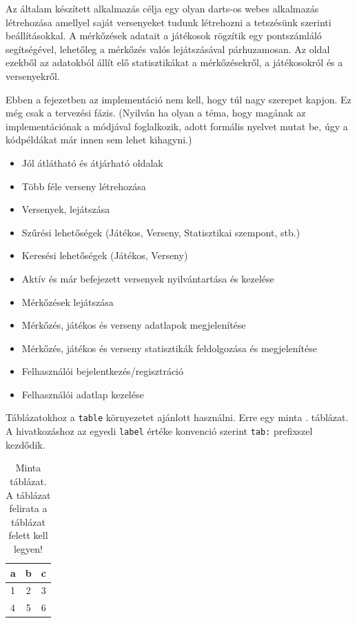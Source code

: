 
Az általam készített alkalmazás célja egy olyan darts-os webes alkalmazás létrehozása amellyel saját versenyeket tudunk létrehozni a tetszésünk szerinti beállításokkal. A mérkőzések adatait a játékosok rögzítik egy pontszámláló segítségével, lehetőleg a mérkőzés valós lejátszásával párhuzamosan. Az oldal ezekből az adatokból állít elő statisztikákat a mérkőzésekről, a játékosokról és a versenyekről.


Ebben a fejezetben az implementáció nem kell, hogy túl nagy szerepet kapjon.
Ez még csak a tervezési fázis.
(Nyilván ha olyan a téma, hogy magának az implementációnak a módjával foglalkozik, adott formális nyelvet mutat be, úgy a kódpéldákat már innen sem lehet kihagyni.)

\begin{itemize}
\item Jól átlátható és átjárható oldalak
\item Több féle verseny létrehozása
\item Versenyek, lejátszása
\item Szűrési lehetőségek (Játékos, Verseny, Statisztikai szempont, stb.)
\item Keresési lehetőségek (Játékos, Verseny)
\item Aktív és már befejezett versenyek nyilvántartása és kezelése
\item Mérkőzések lejátszása
\item Mérkőzés, játékos és verseny adatlapok megjelenítése
\item Mérkőzés, játékos és verseny statisztikák feldolgozása és megjelenítése
\item Felhasználói bejelentkezés/regisztráció
\item Felhasználói adatlap kezelése

\end{itemize}

Táblázatokhoz a \texttt{table} környezetet ajánlott használni.
Erre egy minta . táblázat.
A hivatkozáshoz az egyedi \texttt{label} értéke konvenció szerint \texttt{tab:} prefixszel kezdődik.

\begin{table}[h]
\centering
\caption{Minta táblázat. A táblázat felirata a táblázat felett kell legyen!}
\label{tab:minta}
\begin{tabular}{l|c|c|}
a & b & c \\
\hline
1 & 2 & 3 \\
4 & 5 & 6 \\
\hline
\end{tabular}
\end{table}

